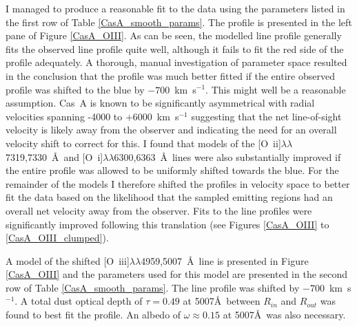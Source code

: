 I managed to produce a reasonable fit to the data using the parameters listed in the first row of Table \ref{CasA_smooth_params}.  The profile is presented in the left pane of Figure \ref{CasA_OIII}.  As can be seen,  the modelled line profile generally fits the observed line profile quite well, although it fails to fit the red side of the profile adequately.  A thorough, manual investigation of parameter space resulted in the conclusion that the profile was much better fitted if the entire observed profile was shifted to the blue by $-700$~km~s$^{-1}$.  This might well be a reasonable assumption.  Cas~A is known to be significantly asymmetrical \citep{Rest2011} with radial velocities spanning -4000 to +6000~km~s$^{-1}$ \citep{Milisavljevic2013} suggesting that the net line-of-sight velocity is likely away from the observer and indicating the need for an overall velocity shift to correct for this.  I found that models of the  [O~{\sc ii}]$\lambda\lambda$7319,7330~\AA\ and [O~{\sc i}]$\lambda\lambda$6300,6363~\AA\  lines were also substantially improved if the entire profile was allowed to be uniformly shifted towards the blue.  For the remainder of the models I therefore shifted the profiles in velocity space to better fit the data based on the likelihood that the sampled emitting regions had an overall net velocity away from the observer.  Fits to the line profiles were significantly improved following this translation (see Figures \ref{CasA_OIII} to \ref{CasA_OIII_clumped}).

A model of the shifted [O~{\sc iii}]$\lambda\lambda$4959,5007~\AA\  line is presented in Figure \ref{CasA_OIII} and the parameters used for this model are presented in the second row of Table \ref{CasA_smooth_params}.  The line profile was shifted by $-700$~km~s$^{-1}$.  A total dust optical depth of $\tau=0.49$ at 5007\AA\  between $R_{in}$ and $R_{out}$ was found to best fit the profile.  An albedo of $\omega\approx0.15$ at 5007\AA\  was also necessary.


